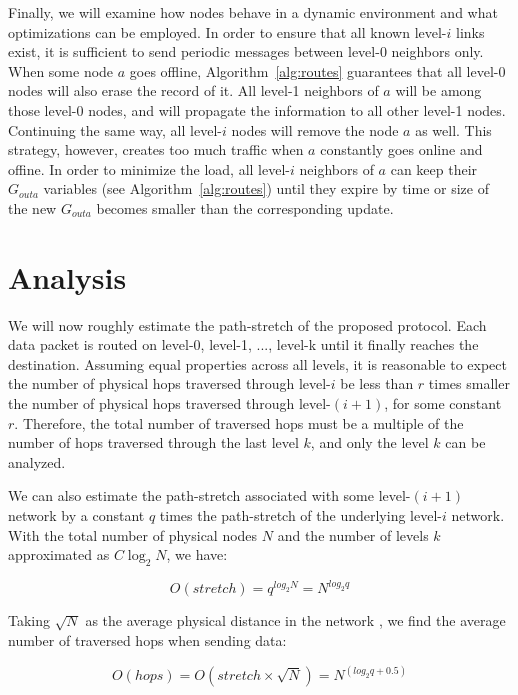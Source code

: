 \documentclass[14pt]{extarticle}
\theoremstyle{definition}
\begin{document}
Finally, we will examine how nodes behave in a dynamic environment and what optimizations can be employed. In order to ensure that all known level-$i$ links exist, it is sufficient to send periodic messages between level-0 neighbors only. When some node $a$ goes offline, Algorithm~\ref{alg:routes} guarantees that all level-0 nodes will also erase the record of it. All level-1 neighbors of $a$ will be among those level-0 nodes, and will propagate the information to all other level-1 nodes. Continuing the same way, all level-$i$ nodes will remove the node $a$ as well. This strategy, however, creates too much traffic when $a$ constantly goes online and offine. In order to minimize the load, all level-$i$ neighbors of $a$ can keep their $G_{outa}$ variables (see Algorithm~\ref{alg:routes}) until they expire by time or size of the new $G_{outa}$ becomes smaller than the corresponding update.


\section{Analysis}

We will now roughly estimate the path-stretch of the proposed protocol. Each data packet is routed on level-0, level-1, ..., level-k until it finally reaches the destination. Assuming equal properties across all levels, it is reasonable to expect the number of physical hops traversed through level-$i$ be less than $r$ times smaller the number of physical hops traversed through level-$(i+1)$, for some constant $r$. Therefore, the total number of traversed hops must be a multiple of the number of hops traversed through the last level $k$, and only the level $k$ can be analyzed.

We can also estimate the path-stretch associated with some level-$(i+1)$ network by a constant $q$ times the path-stretch of the underlying level-$i$ network. With the total number of physical nodes $N$ and the number of levels $k$ approximated as $C\log_2 N$, we have:

\begin{equation*}
    O(stretch) = q^{\displaystyle log_2 N} = N^{\displaystyle log_2 q}
\end{equation*}

Taking $\sqrt{N}$ as the average physical distance in the network \cite{Kleinrock}, we find the average number of traversed hops when sending data:

\begin{equation*}
    O(hops) = O(stretch \times \sqrt{N}) = N^{\displaystyle (log_2 q + 0.5)}
\end{equation*}
\end{document}
